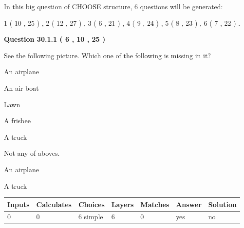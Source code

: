 \documentclass[12pt]{article}
\begin{document}
   
\vspace{0.2in}
   
 In this big question of CHOOSE structure,            6  questions will be generated: 
  
  
             1 (          10 ,          25 )
 ,
             2 (          12 ,          27 )
 ,
             3 (           6 ,          21 )
 ,
             4 (           9 ,          24 )
 ,
             5 (           8 ,          23 )
 ,
             6 (           7 ,          22 )
 .
  
\vspace{0.2in}
  
{\textbf{\Large{Question
30.1.1 
 (           6 ,          10 ,          25 )
}}}
  
  
See the following picture.
Which one of the following is missing in it?
 
 
An airplane
 
 
An air-boat
 
 
Lawn
 
 
A frisbee
 
 
A truck
 
 
  Not any of aboves.
 
 
\noindent{}
 
 
An airplane
 
 
A truck
 
 
\noindent{}
 
 
 
\vspace{0.3in}
   
   
   
   
\noindent\begin{tabular}{|l|l|l|l|l|l|l|}
 \hline
Inputs & Calculates & Choices & Layers & Matches & Answer & Solution \\ \hline
           0  & 
           0  & 
           6
  simple  
  & 
           6  & 
           0  & 
  yes & 
  no 
  \\ \hline
 \end{tabular}
   
\end{document}
